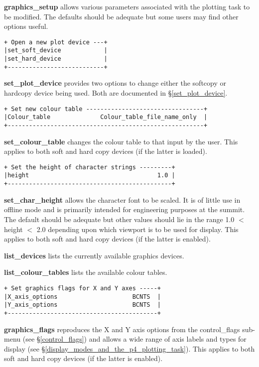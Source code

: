 {{\bf graphics\_setup} allows various parameters associated with the plotting
task to be modified. The defaults should be adequate but some users may 
find other options useful.

\begin{verbatim}
+ Open a new plot device ---+
|set_soft_device            |
|set_hard_device            |
+---------------------------+
\end{verbatim}

{\bf set\_plot\_device} provides two options to change either the softcopy
or hardcopy device being used. Both are documented in \S \ref{set_plot_device}.

\begin{verbatim}
+ Set new colour table ---------------------------------+
|Colour_table              Colour_table_file_name_only  |
+-------------------------------------------------------+
\end{verbatim}

{\bf set\_colour\_table} changes the colour table to that input by the
user. This applies to both soft and hard copy devices (if the latter is
loaded).

\begin{verbatim}
+ Set the height of character strings ---------+
|height                                    1.0 |
+----------------------------------------------+
\end{verbatim}

{\bf set\_char\_height} allows the character font to be scaled. It is
of little use in offline mode and is primarily intended for engineering
purposes at the summit. The default should be adequate but other values
should lie in the range 1.0 $<$ height $<$ 2.0 depending upon which viewport
is to be used for display. This applies to both soft and hard copy devices
(if the latter is enabled).

{\bf list\_devices} lists the currently available graphics devices.

{\bf list\_colour\_tables} lists the available colour tables.

\begin{verbatim}
+ Set graphics flags for X and Y axes -----+
|X_axis_options                     BCNTS  |
|Y_axis_options                     BCNTS  |
+------------------------------------------+
\end{verbatim}

{\bf graphics\_flags} reproduces the X and Y axis options from the
{\sf control\_flags} sub-menu (see \S \ref{control_flags}) and allows 
a wide range of axis labels and types for display (see 
\S \ref{display_modes_and_the_p4_plotting_task}).
This applies to both soft and hard copy devices
(if the latter is enabled).

}

